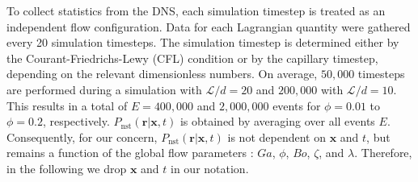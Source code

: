 To collect statistics from the DNS, each simulation timestep is treated as an independent flow configuration. 
Data for each Lagrangian quantity were gathered every 20 simulation timesteps. 
The simulation timestep is determined either by the Courant-Friedrichs-Lewy (CFL) condition or by the capillary timestep, depending on the relevant dimensionless numbers.
On average, $50,000$ timesteps are performed during a simulation with $\mathcal{L}/d=20$ and $200,000$ with $\mathcal{L}/d=10$. 
This results in a total of $E = 400,000$ and $2,000,000 $ events for $\phi = 0.01$ to $\phi=0.2$, respectively.
$P_\text{nst}(\textbf{r}|\textbf{x},t)$ is obtained by averaging over all events $E$. 
Consequently, for our concern, $P_\text{nst}(\textbf{r}|\textbf{x},t)$ is not dependent on $\mathbf{x}$ and $t$, but remains a function of the global flow parameters :  $Ga$, $\phi$, $Bo$, $\zeta$, and $\lambda$.
Therefore, in the following we drop $\mathbf{x}$ and $t$ in our notation. 

